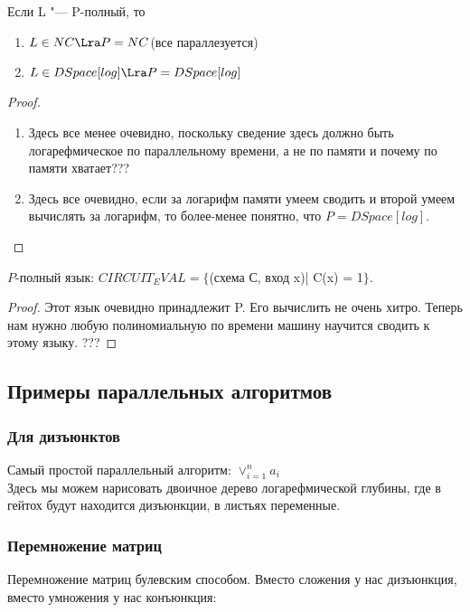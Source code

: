 \begin{theorem}
	Если L "--- P-полный, то 
	\begin{enumerate}
		\item  $L \in NC \Lra P = NC$(все параллезуется)
		\item  $L \in DSpace[log] \Lra P = DSpace[log]$
    \end{enumerate}
\end{theorem}
\begin{proof}
	\begin{enumerate}
	\item Здесь все менее очевидно, поскольку сведение здесь должно быть логарефмическое по параллельному 
	времени, а не по памяти и почему по памяти хватает???
	\item Здесь все очевидно, если за логарифм памяти умеем сводить и второй умеем вычислять за логарифм, то более-менее понятно, 
	что $P = DSpace[log]$.
\end{enumerate}
\end{proof}

\begin{theorem}
	$P$-полный язык: $CIRCUIT_EVAL = \{$(схема С, вход x)| C(x) = 1$\}$. \\
\end{theorem}
\begin{proof}
	Этот язык очевидно принадлежит P. Его вычислить не очень хитро. Теперь нам нужно любую
	полиномиальную по времени машину научится сводить к этому языку. 
	???
\end{proof}

\subsection{Примеры параллельных алгоритмов}
\subsubsection{Для дизъюнктов}
Самый простой параллельный алгоритм: $\vee_{i = 1}^{n}a_i$\\

Здесь мы можем нарисовать двоичное дерево логарефмической глубины, где в гейтох будут находится дизъюнкции, в листьях переменные.

\subsubsection{Перемножение матриц}
Перемножение матриц булевским способом. Вместо сложения у нас дизъюнкция, вместо умножения у нас конъюнкция:

